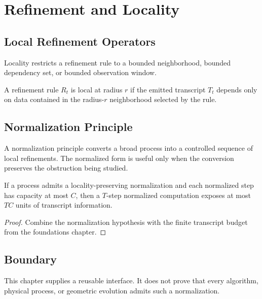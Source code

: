 \chapter{Refinement and Locality}

\section{Local Refinement Operators}

Locality restricts a refinement rule to a bounded neighborhood, bounded dependency set, or bounded observation window.

\begin{definition}
A refinement rule \(R_t\) is local at radius \(r\) if the emitted transcript \(T_t\) depends only on data contained in the radius-\(r\) neighborhood selected by the rule.
\end{definition}

\section{Normalization Principle}

A normalization principle converts a broad process into a controlled sequence of local refinements.  The normalized form is useful only when the conversion preserves the obstruction being studied.

\begin{lemma}
If a process admits a locality-preserving normalization and each normalized step has capacity at most \(C\), then a \(T\)-step normalized computation exposes at most \(TC\) units of transcript information.
\end{lemma}

\begin{proof}
Combine the normalization hypothesis with the finite transcript budget from the foundations chapter.
\end{proof}

\section{Boundary}

This chapter supplies a reusable interface.  It does not prove that every algorithm, physical process, or geometric evolution admits such a normalization.
